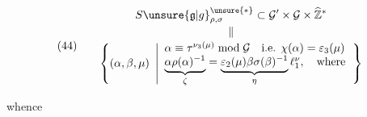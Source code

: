 
\[
(44)\qquad
\begin{gathered}
S\unsure{\mathfrak{g}|g}_{\rho,\sigma}^{\unsure{*}}
\subset \mathcal{G}'\times\mathcal{G}\times\widehat{\mathbb Z}^{*}
\\[-2pt]
\Vert\\[-2pt]
\left\{(\alpha,\beta,\mu)\ \left|
\begin{array}{l}
\alpha\equiv\tau^{\nu_3(\mu)}\bmod\mathcal{G}
\quad\text{i.e. }\chi(\alpha)=\varepsilon_3(\mu)\\
\underbrace{\alpha\rho(\alpha)^{-1}}_{\zeta}
=\underbrace{\varepsilon_2(\mu)\beta\sigma(\beta)^{-1}}_{\eta}
\ell_1^\nu,\quad\text{where}
\end{array}\right.\right\}
\end{gathered}
\]
\inserted{\[
\nu=(\mu-1)/2,\qquad\uline{(\ell_1=\varepsilon_1^2)}
\]}

\deleted{\[
(\unsure{36})\qquad
\unsure{\mathfrak{g}|g}_{\rho,\sigma}^{\unsure{*}\,\mathrm{eff}}
=\left\{(\alpha,\beta,\mu)\in
\unsure{\mathfrak{g}|g}_{\rho,\sigma}^{*}\ \middle|\ \unsure{\exists}\right.
\]}

whence

